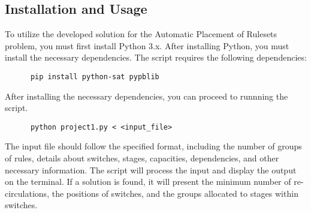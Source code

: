 \subsection{Installation and Usage}

To utilize the developed solution for the Automatic Placement of Rulesets problem, you must first install Python 3.x. After installing Python, you must install the necessary dependencies. The script requires the following dependencies:

\begin{verbatim}
      pip install python-sat pypblib
\end{verbatim}

After installing the necessary dependencies, you can proceed to runnning the script.

\begin{verbatim}
      python project1.py < <input_file>
\end{verbatim}

The input file should follow the specified format, including the number of groups of rules, details about switches, stages, capacities, dependencies, and other necessary information. The script will process the input and display the output on the terminal. If a solution is found, it will present the minimum number of re-circulations, the positions of switches, and the groups allocated to stages within switches.